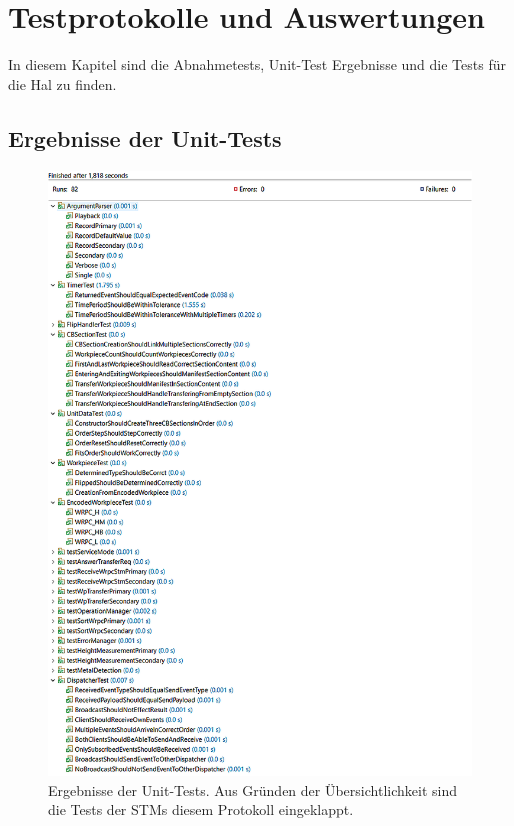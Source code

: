 \section{Testprotokolle und Auswertungen}\label{sec:testprotokolle-und-auswertungen}

In diesem Kapitel sind die Abnahmetests, Unit-Test Ergebnisse und die Tests für die Hal zu finden.

\subsection{Ergebnisse der Unit-Tests}\label{subsec:unit-tests-results}
\begin{figure}[H]
    \centering
    \includegraphics[scale = 0.45]{anhang/unit-test-execution.png}
    \caption{Ergebnisse der Unit-Tests. Aus Gründen der Übersichtlichkeit sind die Tests der STMs diesem Protokoll eingeklappt.}
    \label{fig:unit-test-execution}
\end{figure}

